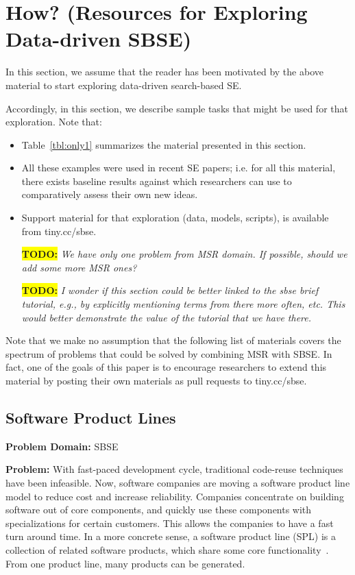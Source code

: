 \documentclass[sigconf,anonymous,review]{acmart}
\newcommand\TODO[1]{\textcolor{ScarletRed}{\textbf{\colorbox{yellow}{\small TODO:}} \emph{#1}}\xspace}
\begin{document}
\section{How? (Resources for Exploring Data-driven SBSE)}\label{sec:scenarios}
In this section, we assume that the reader
has been motivated by the above material
to start exploring data-driven search-based SE.

Accordingly, in this section, we describe sample
tasks that might be used for that exploration.
Note that:
\begin{itemize}
\item
Table~\ref{tbl:only1} summarizes the material presented in this section. 
\item All these examples were used in recent SE
papers; i.e. for all this material, there exists baseline results against which researchers can use to  comparatively
assess  their own new ideas.
\item
Support material for that exploration (data, models, scripts),
is available from tiny.cc/sbse.

\TODO{We have only one problem from MSR domain. If possible, should we add some more MSR ones?}

\TODO{I wonder if this section could be better linked to the sbse brief tutorial, e.g., by explicitly mentioning terms from there more often, etc. This would better demonstrate the value of the tutorial that we have there.}

\end{itemize}
Note that we make no assumption that the following list of materials
covers the spectrum of problems that could be solved by combining MSR with SBSE. In fact, one of the goals of this paper is to encourage researchers to extend this material by posting their own materials as pull requests to tiny.cc/sbse.

    \subsection{Software Product Lines}\label{spl}
    \textbf{Problem Domain: } SBSE
    
    \noindent\textbf{Problem:} With fast-paced development cycle, traditional code-reuse techniques have been infeasible. Now, software companies are moving a software product line model to reduce cost and increase reliability. Companies concentrate on building software out of core components, and quickly use these components with specializations for certain customers. This allows the companies to have a fast turn around time. In a more concrete sense, a software product line (SPL) is a collection of related software products, which share some core functionality~\cite{harman2014search}. From one product line, many products can be generated. 
    
\end{document}
